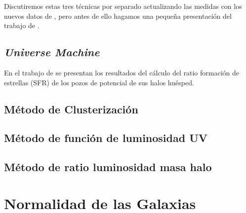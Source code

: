 Discutiremos estas tres técnicas por separado actualizando las medidas con los nuevos datos de \cite{behroozi2019universemachine}, pero antes de ello hagamos una pequeña presentación del trabajo de \cite{behroozi2019universemachine}.

\subsection{\textit{Universe Machine}}

En el trabajo de \cite{behroozi2019universemachine} se presentan los resultados del cálculo del ratio formación de estrellas (SFR) de los pozos de potencial de sus halos huésped.

\subsection{Método de Clusterización}

\subsection{Método de función de luminosidad UV}

\subsection{Método de ratio luminosidad masa halo}

\section{Normalidad de las Galaxias}

